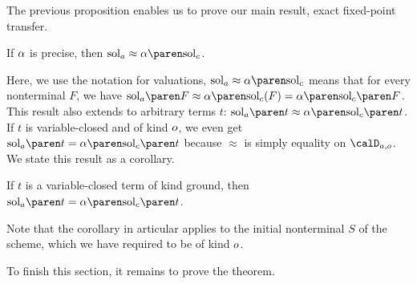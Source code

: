 \documentclass[../../diss.tex]{subfiles}
\begin{document}
%
\cheatpagebreak
%

The previous proposition enables us to prove our main result, exact fixed-point transfer.

\begin{theorem}%
\label{Theorem:HORSEFPT}%
    If $\abs$ is precise, then $\sola \approx \abs{\solc}$.
\end{theorem}

Here, we use the notation for valuations, \ie  $\sola \approx \abs{\solc}$ means that for every nonterminal $F$, we have $\sola{F} \approx \abs{\solc}(F) = \abs{\solc{F}}$.
This result also extends to arbitrary terms $t$: $\sola{t} \approx \abs{\solc{t}}$.
If $t$ is variable-closed and of kind $o$, we even get $\sola{t} = \abs{\solc{t}}$ because $\approx$ is simply equality on $\domaina{\ground}$.
We state this result as a corollary.

\begin{corollary}%
\label{Corollary:HORSEFPT}%
    If $t$ is a variable-closed term of kind ground, then $\sola{t} = \abs{\solc{t}}$.
\end{corollary}

Note that the corollary in articular applies to the initial nonterminal $S$ of the scheme, which we have required to be of kind $o$.

To finish this section, it remains to prove the theorem.
\end{document}

